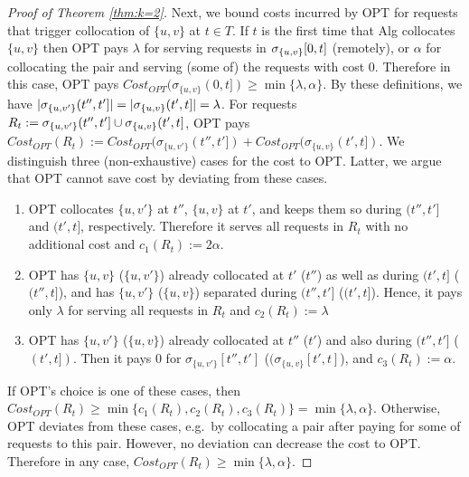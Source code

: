 \documentclass[manuscript,screen=true, review, anonymous]{acmart}
\DeclarePairedDelimiter\set{\{}{\}}
\begin{document}
\begin{proof}[Proof of Theorem \ref{thm:k=2}]
	Next,
	we bound  costs incurred by OPT	for requests that trigger collocation of $\{u,v\}$ at $t \in T$.
	If $t$ is the first time that Alg collocates $\{u,v\}$ then  OPT pays
	$\lambda$ for serving requests in $\sigma_{\set{u,v}}[0,t]$ (remotely),
	or $\alpha$ for collocating the pair and
	serving (some of) the requests with cost 0.
	Therefore in this case,
	OPT pays
	$\mathit{Cost}_{\mathit{OPT}} (\sigma_{\{u,v\}}(0,t]) \geq  \min{\{ \lambda,\alpha \}}$.
	By these definitions,
	we have
	$| \sigma_{\set{u,v'}}(t'',t'] | = | \sigma_{\set{u,v}}(t',t] |  =  \lambda$.
	For requests $R_t := \sigma_{\set{u,v'}}(t'',t']  \cup \sigma_{\set{u,v}}(t',t]$,
	OPT pays
	$\mathit{Cost}_{\mathit{OPT}} (R_t) := \mathit{Cost}_{\mathit{OPT}} (\sigma_{\{u,v'\}}(t'',t']) 
	+ \mathit{Cost}_{\mathit{OPT}} (\sigma_{\{u,v\}}(t',t]) $.
	We distinguish three (non-exhaustive) cases for the cost to OPT.
	Latter,
	 we argue that OPT cannot save cost by deviating from these cases.
	\begin{enumerate}[label=\roman*.]
		\item
		OPT collocates $\{u,v'\}$ at  $t''$, $\{u,v\}$  at $t'$,
		and keeps them so during $(t'',t']$ and $(t',t]$, respectively.
		Therefore it serves all requests in $R_t$ with no additional cost and
		$ c_1 (R_t) := 2\alpha$.
		\item
		OPT has $\{u,v\}$ ($\{u,v'\}$) already collocated at $t'$ ($t''$) as well as during $(t',t]$ ($(t'',t]$),
		and has $\{u,v'\}$ ($\{u,v\}$) separated during $(t'',t']$ ($(t',t]$).
		Hence,
		it pays only $\lambda$ for serving all requests in $R_t$ and
		$c_2 (R_t) := \lambda$
		\item
		OPT has $\{u,v'\}$ ($\{u,v\}$) already collocated at $t''$ ($t'$)  and also during $(t'',t']$ ($(t', t])$.
		Then it pays 0 for $\sigma_{\{u,v'\}}[t'',t']$ ($(\sigma_{\{u,v\}}[t',t]$), and
		$c_3 (R_t) := \alpha$.
	\end{enumerate}
	If OPT's choice is one of these cases,
	then
	$\mathit{Cost}_{\mathit{OPT}} (R_t) \geq
		\min{\{ c_1(R_t), c_2(R_t), c_3(R_t) \}}  =
		\min{ \{ \lambda, \alpha \}}$.
	Otherwise,
	OPT deviates from these cases,
	e.g.~by collocating a pair after paying for some of requests to this pair.
	However,
	no deviation can decrease the cost to OPT.
	Therefore in any case,
	$\mathit{Cost}_{\mathit{OPT}} (R_t) \geq  \min{ \{ \lambda, \alpha \}}$.


\end{proof}
\end{document}
